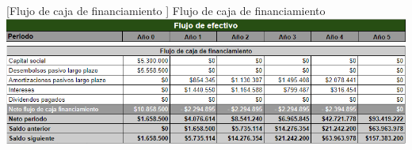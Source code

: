 \vspace{2mm}
\begin{minipage}{0.8\textwidth}
\centering
{}[{Flujo de caja de financiamiento }]{ Flujo de caja de financiamiento }
\label{flujoFinanciamiento}
\includegraphics[width=1.2\textwidth]{Images/tiempo.png}
\includegraphics[width=1.2\textwidth]{Images/flujoEfectivoFinanciamiento.png}
\end{minipage}
